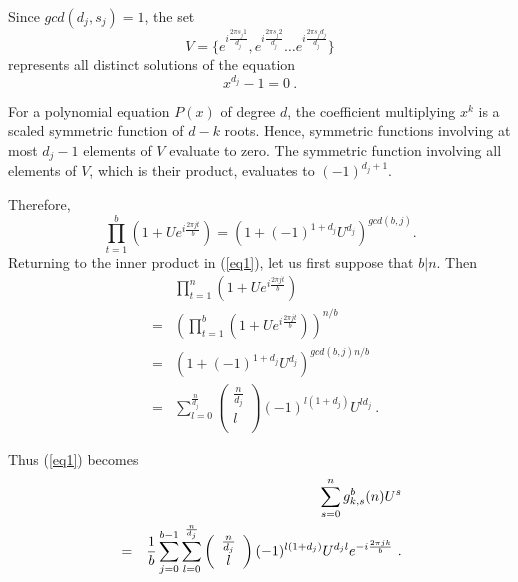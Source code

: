 \documentclass[12pt]{article} \pagestyle{plain} \topmargin
\begin{document}
Since $gcd(d_j,s_j)=1$, the set \[V=\{e^{i\frac{2\pi s_j 1}{d_j}},
e^{i\frac{2\pi s_j 2}{d_j}}\dots e^{i\frac{2\pi s_j d_j}{d_j}}\}\]
represents all distinct solutions of the equation
\begin{equation}\label{poly}
x^{d_j}-1=0~.
\end{equation}

For a polynomial equation $P(x)$ of degree $d$, the coefficient
multiplying $x^k$ is a scaled symmetric function of $d-k$ roots.
Hence, symmetric functions involving at most $d_j-1$ elements of
$V$ evaluate to zero. The symmetric function involving all
elements of $V$, which is their product, evaluates to
$(-1)^{d_j+1}$.

Therefore,
\begin{equation}
\prod_{t=1}^b (1+Ue^{i\frac{2\pi
jt}{b}})=\left(1+(-1)^{1+d_j}U^{d_j} \right)^{gcd(b,j)}.
\end{equation}
 Returning to the inner product in (\ref{eq1}), let us first
suppose that $b|n$. Then
\begin{equation}
\begin{array}{lll}
{}&{}&\prod_{t=1}^n \left(1+Ue^{i\frac{2\pi jt}{b}}\right)\\
{}&=&\left(\prod_{t=1}^b \left(1+Ue^{i\frac{2\pi
jt}{b}}\right)\right)^{n/b}\\
{}&=&\left(1+(-1)^{1+d_j}U^{d_j}
\right)^{gcd(b,j)n/b}\\
{}&=&\sum_{l=0}^{\frac{n}{d_j}} \left( \begin{array}{c}
                             \frac{n}{d_j} \\
                             l \\
                           \end{array}
                           \right)
(-1)^{l(1+d_j)}U^{ld_j}~.
\end{array}
\end{equation}

Thus (\ref{eq1}) becomes
\begin{eqnarray*}
{}&{}&\sum_{s=0}^n g^b_{k,s}(n)U^s\\&=&\frac{1}{b}\sum_{j=0}^{b-1}
\sum_{l=0}^{\frac{n}{d_j}} \left(
\begin{array}{c}
                             \frac{n}{d_j} \\
                             l \\
                           \end{array}
                           \right)(-1)^{l(1+d_j)}U^{d_jl}e^{-i\frac{2\pi
                           j k}{b}}~.\hspace{0.0in}
                           \end{eqnarray*}
\end{document}
